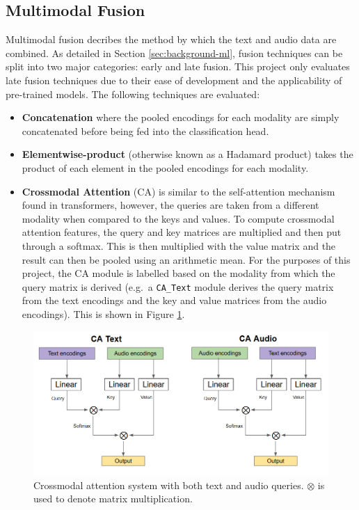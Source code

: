 \documentclass[twocolumn]{article}
\providecommand{\tightlist}{%
  \setlength{\itemsep}{0pt}\setlength{\parskip}{0pt}}
\begin{document}
\subsection{Multimodal Fusion}\label{sec:mm-fusion}

Multimodal fusion decribes the method by which the text and audio data
are combined. As detailed in Section \ref{sec:background-ml}, fusion
techniques can be split into two major categories: early and late
fusion. This project only evaluates late fusion techniques due to their
ease of development and the applicability of pre-trained models. The
following techniques are evaluated:

\begin{itemize}
\tightlist
\item
  \textbf{Concatenation} where the pooled encodings for each modality
  are simply concatenated before being fed into the classification head.
\item
  \textbf{Elementwise-product} (otherwise known as a Hadamard product)
  takes the product of each element in the pooled encodings for each
  modality.
\item
  \textbf{Crossmodal Attention} (CA) is similar to the self-attention
  mechanism found in transformers, however, the queries are taken from a
  different modality when compared to the keys and values. To compute
  crossmodal attention features, the query and key matrices are
  multiplied and then put through a softmax. This is then multiplied
  with the value matrix and the result can then be pooled using an
  arithmetic mean. For the purposes of this project, the CA module is
  labelled based on the modality from which the query matrix is derived
  (e.g.~a \texttt{CA\_Text} module derives the query matrix from the
  text encodings and the key and value matrices from the audio
  encodings). This is shown in Figure \ref{fig:crossmodal-attention}.
\end{itemize}

\begin{figure}[t!]
\centering
\includegraphics[width=16cm]{crossmodal-attention}
\caption{Crossmodal attention system with both text and audio queries. $\otimes$ is used to denote matrix multiplication.\label{fig:crossmodal-attention}}
\end{figure}
\end{document}
